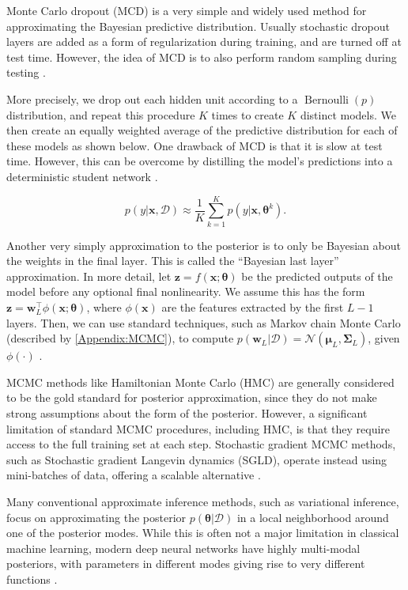 \documentclass[../../../main.tex]{subfiles}
\begin{document}
Monte Carlo dropout (MCD) is a very simple and widely used method for approximating the Bayesian predictive distribution. Usually stochastic dropout layers are added as a form of regularization during training, and are turned off at test time. However, the idea of MCD is to also perform random sampling during testing \autocite{Murphy2023}.

More precisely, we drop out each hidden unit according to a $\operatorname{Bernoulli}(p)$ distribution, and repeat this procedure $K$ times to create $K$ distinct models. We then create an equally weighted average of the predictive distribution for each of these models as shown below. One drawback of MCD is that it is slow at test time. However, this can be overcome by distilling the model's predictions into a deterministic student network \autocite{Murphy2023}.

\begin{equation}
p(y|\bm{x},\mathcal{D}) \approx \frac{1}{K}\sum_{k=1}^{K}p(y|\bm{x},\bm{\theta}^k).
\end{equation}

Another very simply approximation to the posterior is to only be Bayesian about the weights in the final layer. This is called the ``Bayesian last layer'' approximation. In more detail, let $\bm{z}=f(\bm{x};\bm{\theta})$ be the predicted outputs of the model before any optional final nonlinearity. We assume this has the form $\bm{z}=\bm{w}_L^\top\phi(\bm{x};\bm{\theta})$, where $\phi(\bm{x})$ are the features extracted by the first $L-1$ layers. Then, we can use standard techniques, such as Markov chain Monte Carlo (described by \autoref{Appendix:MCMC}), to compute $p(\bm{w}_L|\mathcal{D})=\mathcal{N}(\bm{\mu}_L,\bm{\Sigma}_L)$, given $\phi(\cdot)$ \autocite{Murphy2023}.

MCMC methods like Hamiltonian Monte Carlo (HMC) are generally considered to be the gold standard for posterior approximation, since they do not make strong assumptions about the form of the posterior. However, a significant limitation of standard MCMC procedures, including HMC, is that they require access to the full training set at each step. Stochastic gradient MCMC methods, such as Stochastic gradient Langevin dynamics (SGLD), operate instead using mini-batches of data, offering a scalable alternative \autocite{Murphy2023}.

Many conventional approximate inference methods, such as variational inference, focus on approximating the posterior $p(\bm{\theta}|\mathcal{D})$ in a local neighborhood around one of the posterior modes. While this is often not a major limitation in classical machine learning, modern deep neural networks have highly multi-modal posteriors, with parameters in different modes giving rise to very different functions \autocite{Murphy2023}.
\end{document}
